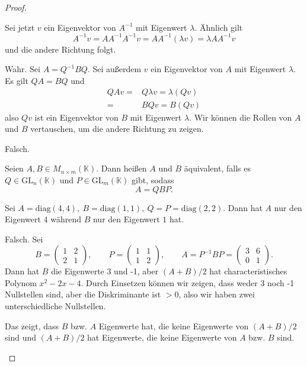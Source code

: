 \begin{proof}
\begin{parts}
		Sei jetzt $v$ ein Eigenvektor von $A^{-1}$ mit Eigenwert $\lambda$. Ähnlich gilt
		\[
			A^{-1}v=A A^{-1}A^{-1}v=A A^{-1}(\lambda v)=\lambda A A^{-1}v
		\]
		und die andere Richtung folgt.
	\item Wahr. Sei $A=Q^{-1}BQ$. Sei außerdem $v$ ein Eigenvektor von $A$ mit Eigenwert $\lambda$. Es gilt $QA=BQ$ und
		\begin{align*}
			QAv=&Q\lambda v=\lambda(Qv)\\
			=&BQv=B(Qv)
		\end{align*}
		also $Qv$ ist ein Eigenvektor von $B$ mit Eigenwert $\lambda$. Wir können die Rollen von $A$ und $B$ vertauschen, um die andere Richtung zu zeigen. 
	\item Falsch.
		\begin{tcolorbox}[title=Definition]
			Seien $A,B\in M_{n\times m}(\mathbb{K})$. Dann heißen $A$ und $B$ äquivalent, falls es $Q\in\text{GL}_n(\mathbb{K})$ und $P\in \text{GL}_m(\mathbb{K})$ gibt, sodass
			\[
			A=QBP
			.\] 
		\end{tcolorbox}
		Sei $A=\text{diag}(4,4),~B=\text{diag}(1,1),~Q=P=\text{diag}(2,2)$. Dann hat $A$ nur den Eigenwert $4$ während $B$ nur den Eigenwert $1$ hat.
	\item Falsch. Sei
		\[
			B=\begin{pmatrix} 1 & 2 \\ 2 & 1 \end{pmatrix},\qquad P=\begin{pmatrix} 1 & 1 \\ 1 & 2 \end{pmatrix},\qquad A=P^{-1}BP=\begin{pmatrix} 3 & 6 \\ 0 & 1 \end{pmatrix} 
		.\] 
		Dann hat $B$ die Eigenwerte 3 und -1, aber $(A+B) / 2$ hat characteristisches Polynom $x^2-2x-4$. Durch Einsetzen können wir zeigen, dass weder 3 noch -1 Nullstellen sind, aber die Diskriminante ist $>0$, also wir haben zwei unterschiedliche Nullstellen.

		Das zeigt, dass $B$ bzw. $A$ Eigenwerte hat, die keine Eigenwerte von $(A+ B) / 2$ sind und $(A + B) / 2$ hat Eigenwerte, die keine Eigenwerte von $A$ bzw. $B$ sind.
	\end{parts}
\end{proof}
